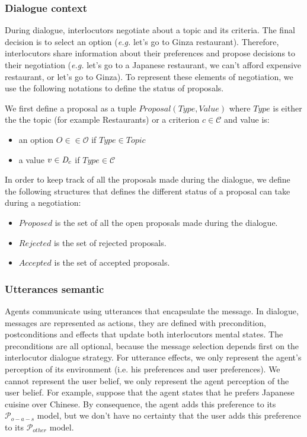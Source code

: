 \documentclass{llncs}
\begin{document}
 
\subsubsection{Dialogue context}
During dialogue, interlocutors  negotiate  about a topic and its criteria. The final decision is to select an option (\emph{e.g.} let's go to Ginza restaurant). Therefore, interlocutors share information about their preferences and propose decisions to their negotiation (\emph{e.g.} let's go to a Japanese restaurant, we can't afford expensive restaurant, or let's go to Ginza). To represent these elements of negotiation, we use the following notations to define the status of proposals.

We first define a proposal as a tuple $Proposal(Type, Value)$ where  $Type$ is either the the topic (for example Restaurants) or a criterion $c \in \mathcal{C}$ and value is:
\begin{itemize}
	\item an option $O \in \in \mathcal{O}$ if $Type \in Topic$ 
	\item a value $v \in \emph{D}_c$ if $Type \in \mathcal{C}$
\end{itemize}
    

In order to keep track of all the proposals made during the dialogue, we define the following structures that defines the different status of a proposal can take during a negotiation:
 \begin{itemize}
	 	\item $Proposed$ is the set of all the open proposals made during the dialogue.
	 	\item $Rejected$  is the set of rejected proposals.
	 	\item $Accepted$  is the set of accepted proposals.
 \end{itemize}


\subsubsection{Utterances semantic}
Agents communicate using utterances that encapsulate the message. In dialogue, messages are represented as actions, they are defined with precondition, postconditions and effects that update both interlocutors mental states. The preconditions are all optional, because the message selection depends first on the interlocutor dialogue strategy. For utterance effects, we only represent the  agent's perception of its environment (i.e. his preferences and user preferences). We cannot represent the user belief, we only represent the agent perception of the user belief. For example, suppose that the agent states that he prefers Japanese cuisine over Chinese. By consequence, the agent adds this preference to its $\mathcal{P}_{o-a-s}$ model, but we don't have no certainty that the user adds this preference to its $\mathcal{P}_{other}$  model.
\end{document}
